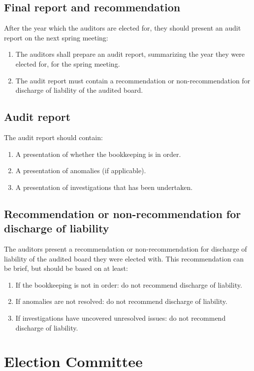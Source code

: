 \subsection{Final report and recommendation} \label{sec:finalReport}
After the year which the auditors are elected for, they should present an audit report on the next spring meeting:
\begin{enumerate}
  \item The auditors shall prepare an audit report, summarizing the year they were elected for, for the spring meeting. 
  \item The audit report must contain a recommendation or non-recommendation for discharge of liability of the audited board.
\end{enumerate}

\subsection{Audit report}
The audit report should contain:
\begin{enumerate}
  \item A presentation of whether the bookkeeping is in order.
  \item A presentation of anomalies (if applicable).
  \item A presentation of investigations that has been undertaken.
\end{enumerate}

\subsection{Recommendation or non-recommendation for discharge of liability}
The auditors present a recommendation or non-recommendation for discharge of liability of the audited board they were elected with.
This recommendation can be brief, but should be based on at least:
\begin{enumerate}
  \item If the bookkeeping is not in order: do not recommend discharge of liability.
  \item If anomalies are not resolved: do not recommend discharge of liability.
  \item If investigations have uncovered unresolved issues: do not recommend discharge of liability.
\end{enumerate}

\section*{Election Committee}
